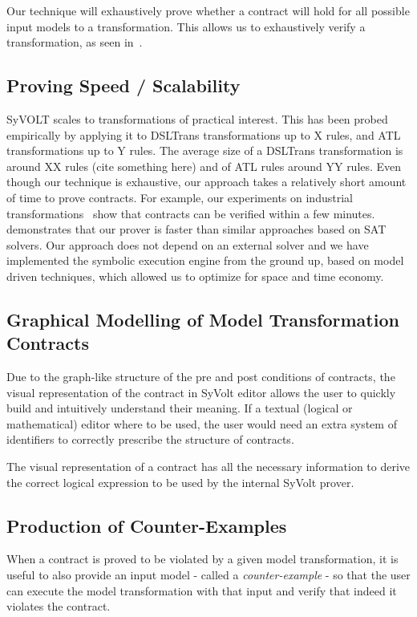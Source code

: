 Our technique will exhaustively prove whether a contract will hold for all
possible input models to a transformation. This allows us to exhaustively verify
a transformation, as seen in~\cite{Lucio2014}.

\subsection{Proving Speed / Scalability}

SyVOLT scales to transformations of practical interest. This has been probed
empirically by applying it to DSLTrans transformations up to X rules, and ATL
transformations up to Y rules. The average size of a DSLTrans transformation is
around XX rules (cite something here) and of ATL rules around YY rules. Even
though our technique is exhaustive, our approach takes a relatively short amount
of time to prove contracts. For example, our experiments on industrial
transformations~\cite{Oakes} show that contracts can be verified within a few
minutes. \cite{Selim2014} demonstrates that our prover is faster than similar
approaches based on SAT solvers. Our approach does not depend on an external
solver and we have implemented the symbolic execution engine from the ground up,
based on model driven techniques, which allowed us to optimize for space and
time economy.

\subsection{Graphical Modelling of Model Transformation Contracts}

Due to the graph-like structure of the pre and post conditions of contracts, the
visual representation of the contract in SyVolt editor allows the user to
quickly build and intuitively understand their meaning.
If a textual (logical or mathematical) editor where to be used, the user would
need an extra system of identifiers to correctly prescribe the structure of contracts.

The visual representation of a contract has all the necessary information to derive the correct 
logical expression to be used by the internal SyVolt prover.

\subsection{Production of Counter-Examples}

When a contract is proved to be violated by a given model transformation, it is useful to also provide an input model - called a \emph{counter-example} - so that the user can execute the model transformation with that input and verify that indeed it violates the contract.

